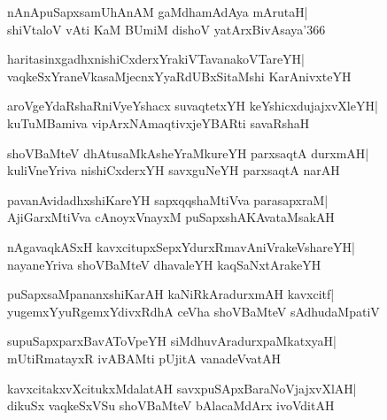 \documentclass[twoside,12pt,openright]{book}
\newcounter{shloka}[chapter]
\begin{document}
\begin{shloka}%
nAnApuSapxsamUhAnAM gaMdhamAdAya mArutaH|\\
shiVtaloV vAti KaM BUmiM dishoV yatArxBivAsaya\char'366
\end{shloka}

\begin{shloka}%
haritasinxgadhxnishiCxderxYrakiVTavanakoVTareYH|\\
vaqkeSxYraneVkasaMjecnxYyaRdUBxSitaMshi KarAnivxteYH
\end{shloka}

\begin{shloka}%
aroVgeYdaRshaRniVyeYshacx suvaqtetxYH keYshicxdujajxvXleYH|\\
kuTuMBamiva vipArxNAmaqtivxjeYBARti savaRshaH
\end{shloka}

\begin{shloka}%
shoVBaMteV dhAtusaMkAsheYraMkureYH parxsaqtA durxmAH|\\
kuliVneYriva nishiCxderxYH savxguNeYH parxsaqtA narAH
\end{shloka}

\begin{shloka}%
pavanAvidadhxshiKareYH sapxqqshaMtiVva parasapxraM|\\
AjiGarxMtiVva cAnoyxVnayxM puSapxshAKAvataMsakAH
\end{shloka}

\begin{shloka}%
nAgavaqkASxH kavxcitupxSepxYdurxRmavAniVrakeVshareYH|\\
nayaneYriva shoVBaMteV dhavaleYH kaqSaNxtArakeYH
\end{shloka}

\begin{shloka}%
puSapxsaMpananxshiKarAH kaNiRkAradurxmAH kavxcitf|\\
yugemxYyuRgemxYdivxRdhA ceVha shoVBaMteV sAdhudaMpatiV
\end{shloka}

\begin{shloka}%
supuSapxparxBavAToVpeYH siMdhuvAradurxpaMkatxyaH|\\
mUtiRmatayxR ivABAMti pUjitA vanadeVvatAH
\end{shloka}

\begin{shloka}%
kavxcitakxvXcitukxMdalatAH savxpuSApxBaraNoVjajxvXlAH|\\
dikuSx vaqkeSxVSu shoVBaMteV bAlacaMdArx ivoVditAH
\end{shloka}
\end{document}
